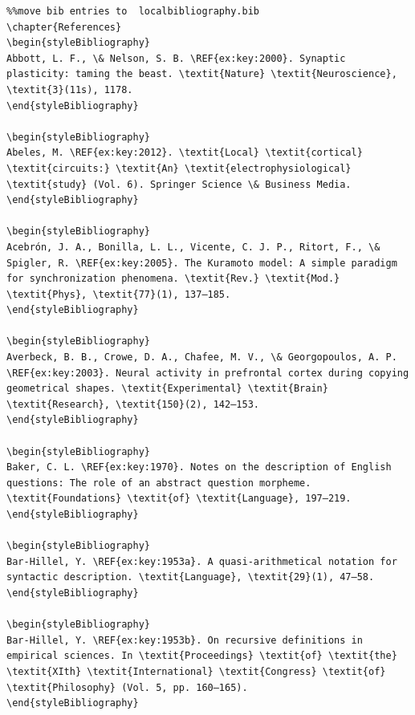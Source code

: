 \begin{verbatim}%%move bib entries to  localbibliography.bib
\chapter{References}
\begin{styleBibliography}
Abbott, L. F., \& Nelson, S. B. \REF{ex:key:2000}. Synaptic plasticity: taming the beast. \textit{Nature} \textit{Neuroscience}, \textit{3}(11s), 1178.
\end{styleBibliography}

\begin{styleBibliography}
Abeles, M. \REF{ex:key:2012}. \textit{Local} \textit{cortical} \textit{circuits:} \textit{An} \textit{electrophysiological} \textit{study} (Vol. 6). Springer Science \& Business Media.
\end{styleBibliography}

\begin{styleBibliography}
Acebrón, J. A., Bonilla, L. L., Vicente, C. J. P., Ritort, F., \& Spigler, R. \REF{ex:key:2005}. The Kuramoto model: A simple paradigm for synchronization phenomena. \textit{Rev.} \textit{Mod.} \textit{Phys}, \textit{77}(1), 137–185.
\end{styleBibliography}

\begin{styleBibliography}
Averbeck, B. B., Crowe, D. A., Chafee, M. V., \& Georgopoulos, A. P. \REF{ex:key:2003}. Neural activity in prefrontal cortex during copying geometrical shapes. \textit{Experimental} \textit{Brain} \textit{Research}, \textit{150}(2), 142–153.
\end{styleBibliography}

\begin{styleBibliography}
Baker, C. L. \REF{ex:key:1970}. Notes on the description of English questions: The role of an abstract question morpheme. \textit{Foundations} \textit{of} \textit{Language}, 197–219.
\end{styleBibliography}

\begin{styleBibliography}
Bar-Hillel, Y. \REF{ex:key:1953a}. A quasi-arithmetical notation for syntactic description. \textit{Language}, \textit{29}(1), 47–58.
\end{styleBibliography}

\begin{styleBibliography}
Bar-Hillel, Y. \REF{ex:key:1953b}. On recursive definitions in empirical sciences. In \textit{Proceedings} \textit{of} \textit{the} \textit{XIth} \textit{International} \textit{Congress} \textit{of} \textit{Philosophy} (Vol. 5, pp. 160–165).
\end{styleBibliography}


\end{verbatim}

